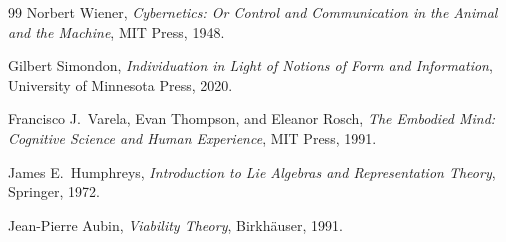 \documentclass[12pt,a4paper]{report}
\theoremstyle{flyxion}
\begin{document}
\begin{thebibliography}{99}
Norbert Wiener,
\textit{Cybernetics: Or Control and Communication in the Animal and the Machine},
MIT Press, 1948.

Gilbert Simondon,
\textit{Individuation in Light of Notions of Form and Information},
University of Minnesota Press, 2020.

Francisco J.\ Varela, Evan Thompson, and Eleanor Rosch,
\textit{The Embodied Mind: Cognitive Science and Human Experience},
MIT Press, 1991.

James E.\ Humphreys,
\textit{Introduction to Lie Algebras and Representation Theory},
Springer, 1972.

Jean-Pierre Aubin,
\textit{Viability Theory},
Birkhäuser, 1991.

\end{thebibliography}
\end{document}
